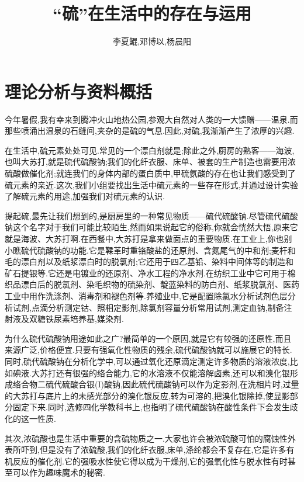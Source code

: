\documentclass[hyperref,UTF8]{ctexart}
\title{``硫''在生活中的存在与运用}
\author{李夏鲲,邓博以,杨晨阳}
\date{}
\begin{document}
\maketitle

\section{理论分析与资料概括}

今年暑假,我有幸来到腾冲火山地热公园,参观大自然对人类的一大馈赠——温泉.而那些喷涌出温泉的石缝间,夹杂的是硫的气息.因此,对硫,我渐渐产生了浓厚的兴趣.

在生活中,硫元素处处可见.常见的一个漂白剂就是;除此之外,厨房的熟客——海波,也叫大苏打,就是硫代硫酸钠;我们的化纤衣服、床单、被套的生产制造也需要用浓硫酸做催化剂;就连我们的身体内部的蛋白质中,甲硫氨酸的存在也让我们感受到了硫元素的亲近.这次,我们小组要找出生活中硫元素的一些存在形式,并通过设计实验了解硫元素的用途,加强我们对硫元素的认识.

提起硫,最先让我们想到的,是厨房里的一种常见物质——硫代硫酸钠.尽管硫代硫酸钠这个名字对于我们可能比较陌生,然而如果说起它的俗称,你就会恍然大悟,原来它就是海波、大苏打啊.在西餐中,大苏打是拿来做面点的重要物质.在工业上,你也别小瞧硫代硫酸钠的功能.它是鞣革时重铬酸盐的还原剂、含氮尾气的中和剂;麦杆和毛的漂白剂以及纸浆漂白时的脱氯剂;它还用于四乙基铅、染料中间体等的制造和矿石提银等.它还是电镀业的还原剂、净水工程的净水剂.在纺织工业中它可用于棉织品漂白后的脱氯剂、染毛织物的硫染剂、靛蓝染料的防白剂、纸浆脱氯剂、医药工业中用作洗涤剂、消毒剂和褪色剂等.养殖业中,它是配置除氯水分析试剂色层分析试剂,点滴分析测定钴、照相定影剂,除氯剂容量分析常用试剂,测定血钠,制备注射液及双糖铁尿素培养基,媒染剂.

为什么硫代硫酸钠用途如此之广?最简单的一个原因,就是它有较强的还原性,而且来源广泛,价格便宜.只要有强氧化性物质的残余,硫代硫酸钠就可以施展它的特长.同时,硫代硫酸钠在分析化学中,可以通过氧化还原滴定测定许多物质的溶液浓度,比如碘液.大苏打还有很强的络合能力,它的水溶液不仅能溶解卤素,还可以和溴化银形成络合物二硫代硫酸合银(I)酸钠,因此硫代硫酸钠可以作为定影剂,在洗相片时,过量的大苏打与底片上的未感光部分的溴化银反应,转为可溶的,把溴化银除掉,使显影部分固定下来.同时,选修四化学教科书上,也指明了硫代硫酸钠在酸性条件下会发生歧化的这一性质.

其次,浓硫酸也是生活中重要的含硫物质之一.大家也许会被浓硫酸可怕的腐蚀性外表所吓到,但是没有了浓硫酸,我们的化纤衣服,床单,涤纶都会不复存在,它是许多有机反应的催化剂.它的强吸水性使它得以成为干燥剂,它的强氧化性与脱水性有时甚至可以作为趣味魔术的秘密.
\end{document}

